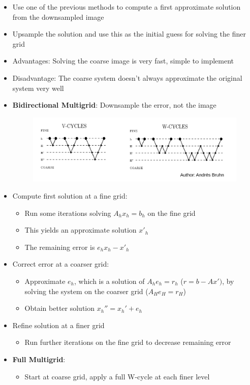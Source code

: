 \documentclass{scrartcl}
\begin{document}
\begin{itemize}
\begin{itemize}
        \item Use one of the previous methods to compute a first approximate solution from the downsampled image
        \item Upsample the solution and use this as the initial guess for solving the finer grid
        \item Advantages: Solving the coarse image is very fast, simple to implement
        \item Disadvantage: The coarse system doesn't always approximate the original system very well
        \item \textbf{Bidirectional Multigrid}: Downsample the error, not the image
        \begin{figure}[h!]
            \centering
            \includegraphics[width=0.9\linewidth]{bidirectionalmultigrid.png}
        \end{figure}
        \item Compute first solution at a fine grid:
        \begin{itemize}
            \item Run some iterations solving $A_hx_h = b_h$ on the fine grid
            \item This yields an approximate solution $x'_h$
            \item The remaining error is $e_h x_h - x'_h$
        \end{itemize}
        \item Correct error at a coarser grid:
        \begin{itemize}
            \item Approximate $e_h$, which is a solution of $A_h e_h = r_h$ ($r = b - Ax')$, by solving the system on the coarser grid ($A_H e_H = r_H$)
            \item Obtain better solution $x_h'' = x_h' + e_h$
        \end{itemize}
        \item Refine solution at a finer grid
        \begin{itemize}
            \item Run further iterations on the fine grid to decrease remaining error
        \end{itemize}
        \item \textbf{Full Multigrid}:
        \begin{itemize}
            \item Start at coarse grid, apply a full W-cycle at each finer level
        \end{itemize}
    \end{itemize}
\end{itemize}
\end{document}
